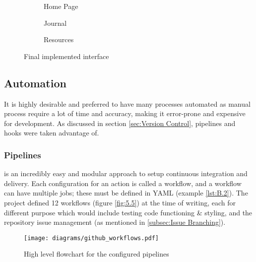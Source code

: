 \documentclass[../main.tex]{subfiles}
\begin{document}
\begin{figure}
    \centering
    \noindent\begin{subfigure}{.3\textwidth}
    \centering
    \caption{Home Page}
    \end{subfigure}\hfill
    \begin{subfigure}{.3\textwidth}
    \centering
    \caption{Journal}
    \end{subfigure}\hfill
    \begin{subfigure}{.3\textwidth}
    \centering
    \caption{Resources}
    \end{subfigure}
    \caption{Final implemented interface}%
\end{figure}

\subsection{Automation}

It is highly desirable and preferred to have many processes automated as manual process require a lot of time and accuracy, making it error-prone and expensive for development. As discussed in section \ref{sec:Version Control}, pipelines and hooks were taken advantage of.

\subsubsection{Pipelines}

 is an incredibly easy and modular approach to setup continuous integration and delivery. Each configuration for an action is called a workflow, and a workflow can have multiple jobs; these must be defined in YAML (example \ref{lst:B.2}). The project defined 12 workflows (figure \ref{fig:5.5}) at the time of writing, each for different purpose which would include testing code functioning \& styling, and the repository issue management (as mentioned in \ref{subsec:Issue Branching}).

\begin{figure}
    \centering
    \texttt{[image: diagrams/github\_workflows.pdf]}
    \caption{High level flowchart for the configured pipelines}%
\end{figure}
\end{document}
